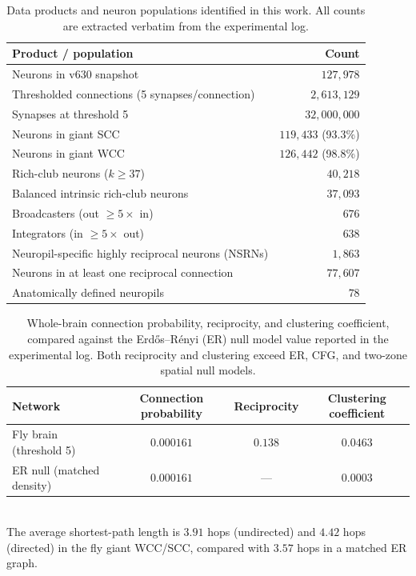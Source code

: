 \documentclass[11pt]{article}
\begin{document}
\begin{table}[htbp]
\centering
\caption{Data products and neuron populations identified in this work.
All counts are extracted verbatim from the experimental log.}
\label{tab:products}
\begin{tabular}{lr}
\toprule
Product / population & Count \\
\midrule
Neurons in v630 snapshot & $127{,}978$ \\
Thresholded connections (5 synapses/connection) & $2{,}613{,}129$ \\
Synapses at threshold 5 & $32{,}000{,}000$ \\
Neurons in giant SCC & $119{,}433$ (93.3\%) \\
Neurons in giant WCC & $126{,}442$ (98.8\%) \\
Rich-club neurons ($k \geq 37$) & $40{,}218$ \\
Balanced intrinsic rich-club neurons & $37{,}093$ \\
Broadcasters (out $\geq 5\times$ in) & $676$ \\
Integrators (in $\geq 5\times$ out) & $638$ \\
Neuropil-specific highly reciprocal neurons (NSRNs) & $1{,}863$ \\
Neurons in at least one reciprocal connection & $77{,}607$ \\
Anatomically defined neuropils & $78$ \\
\bottomrule
\end{tabular}
\end{table}

\begin{table}[htbp]
\centering
\caption{Whole-brain connection probability, reciprocity, and clustering
coefficient, compared against the Erd{\H o}s--R{\'e}nyi (ER) null model
value reported in the experimental log. Both reciprocity and clustering
exceed ER, CFG, and two-zone spatial null models.}
\label{tab:stats}
\begin{tabular}{lccc}
\toprule
Network & Connection probability & Reciprocity & Clustering coefficient \\
\midrule
Fly brain (threshold 5) & $0.000161$ & $0.138$ & $0.0463$ \\
ER null (matched density) & $0.000161$ & --- & $0.0003$ \\
\bottomrule
\end{tabular}
\\[2pt]
\footnotesize{The average shortest-path length is $3.91$ hops (undirected)
and $4.42$ hops (directed) in the fly giant WCC/SCC, compared with $3.57$
hops in a matched ER graph.}
\end{table}
\end{document}
